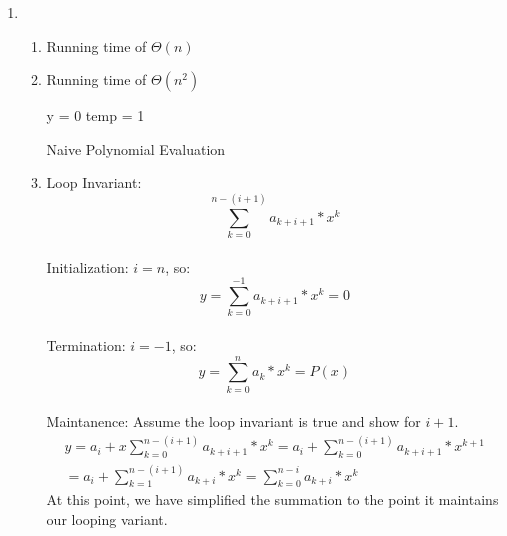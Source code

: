 \documentclass{article}
\begin{document}
\begin{enumerate}
\item
 \begin{enumerate}[label=(\alph*)]
        \item Running time of \(\Theta(n)\)\medskip
        \item Running time of \(\Theta(n^2)\)\\
        \begin{minipage}{.7\linewidth}
        \begin{algorithm}[H]
            \SetAlgoLined
             y = 0\;
             temp = 1\;
           \caption{Naive Polynomial Evaluation}
            \end{algorithm}
        \end{minipage}
        \medskip
        \item Loop Invariant:
        \begin{equation}
            \sum_{k=0}^{n - (i + 1)} a_{k + i + 1} * x^k
        \end{equation}
        \\Initialization: \(i = n\), so:
        \begin{equation}
            y = \sum_{k=0}^{-1} a_{k + i + 1} * x^k = 0
        \end{equation}
        \\Termination: \(i = -1\), so:
        \begin{equation}
            y = \sum_{k=0}^{n} a_{k} * x^k = P(x)
        \end{equation}
        \\Maintanence: Assume the loop invariant is true and show for \(i + 1\).
        \begin{equation}
            \begin{split}
                y = a_i + x\sum_{k=0}^{n - (i + 1)} a_{k + i + 1} * x^k = a_i + \sum_{k=0}^{n - (i + 1)} a_{k + i + 1} * x^{k + 1} \\= a_i + \sum_{k=1}^{n - (i + 1)} a_{k + i} * x^k = \sum_{k=0}^{n - i} a_{k + i} * x^k
            \end{split}
        \end{equation}
        At this point, we have simplified the summation to the point it maintains our looping variant.
    \end{enumerate}
        

\end{enumerate}
\end{document}
